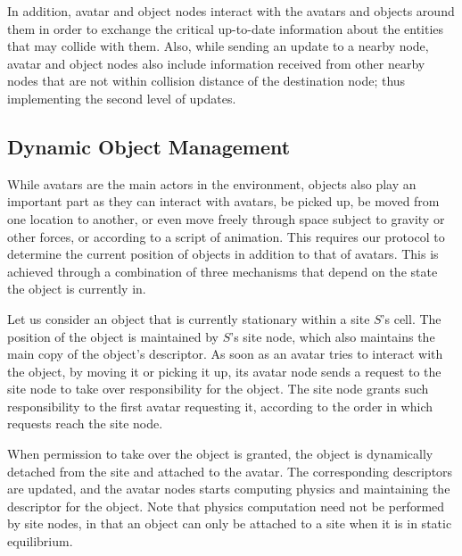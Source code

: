 In addition, avatar and object nodes interact with the avatars and
objects around them in order to exchange the critical up-to-date
information about the entities that may collide with them.  Also,
while sending an update to a nearby node, avatar and object nodes also
include information received from other nearby nodes that are not
within collision distance of the destination node; thus implementing
the second level of \ptp updates. %



 
\subsection{Dynamic Object Management }
\label{sec:manag-inan-objects}
While avatars are the main actors in the \sol environment, objects
also play an important part as they can interact with avatars, be
picked up, be moved from one location to another, or even move freely
through space subject to gravity or other forces, or according to a
script of animation. This requires our protocol to determine the
current position of objects in addition to that of avatars. This is
achieved through a combination of three mechanisms that depend on the
state the object is currently in.

Let us consider an object that is currently stationary within a site
$S$'s cell. The position of the object is maintained by $S$'s site
node, which also maintains the main copy of the object's
descriptor. As soon as an avatar tries to interact with the object, by
moving it or picking it up, its avatar node sends a request to the
site node to take over responsibility for the object. The site node
grants such responsibility to the first avatar requesting it,
according to the order in which requests reach the site node.

When permission to take over the object is granted, the object is
dynamically detached from the site and attached to the avatar. The
corresponding descriptors are updated, and the avatar nodes starts
computing physics and maintaining the descriptor for the object. Note
that physics computation need not be performed by site nodes, in that
an object can only be attached to a site when it is in static
equilibrium.

